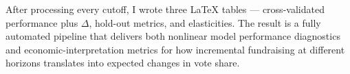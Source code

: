 After processing every cutoff, I wrote three LaTeX tables --- cross-validated performance plus $\Delta$, hold-out metrics, and elasticities. The result is a fully automated pipeline that delivers both nonlinear model performance diagnostics and economic-interpretation metrics for how incremental fundraising at different horizons translates into expected changes in vote share.
